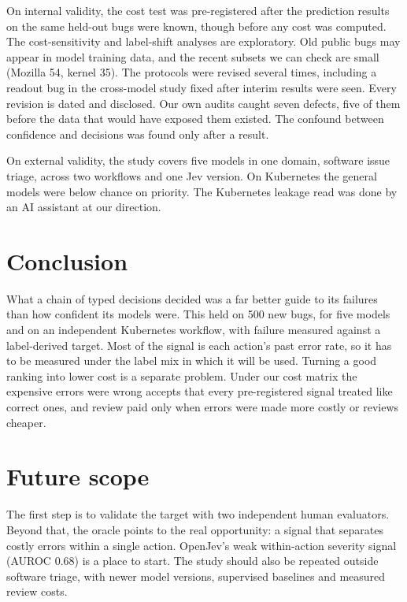 On internal validity, the cost test was pre-registered after the
prediction results on the same held-out bugs were known, though before any cost was computed. The cost-sensitivity and
label-shift analyses are exploratory. Old public bugs may appear in model
training data, and the recent subsets we can check are small (Mozilla 54,
kernel 35). The
protocols were revised several times, including a readout bug in the
cross-model study fixed after interim results were seen. Every revision
is dated and disclosed. Our own audits caught seven defects, five of them
before the data that would have exposed them existed. The confound between confidence and
decisions was found only after a result.

On external validity, the study covers five models in one domain,
software issue triage, across two workflows and one Jev version. On
Kubernetes the general models were below chance on priority. The Kubernetes leakage read was done by an AI
assistant at our direction.

\section{Conclusion}
\label{sec:conclusion}

What a chain of typed decisions decided was a far better guide to its
failures than how confident its models were. This held on 500 new bugs,
for five models and on an independent Kubernetes workflow, with failure
measured against a label-derived target. Most of the signal is each
action's past error rate, so it has to be measured under the label mix
in which it will be used. Turning a good ranking into lower cost is a
separate problem. Under our cost matrix the expensive errors were wrong
accepts that every pre-registered signal treated like correct ones, and
review paid only when errors were made more costly or reviews cheaper.

\section{Future scope}
\label{sec:future}

The first step is to validate the target with two independent human
evaluators. Beyond that, the oracle points to the real opportunity: a
signal that separates costly errors within a single action. OpenJev's
weak within-action severity signal (AUROC 0.68) is a place to start.
The study should also be repeated outside software triage, with newer
model versions, supervised baselines and measured review costs.

